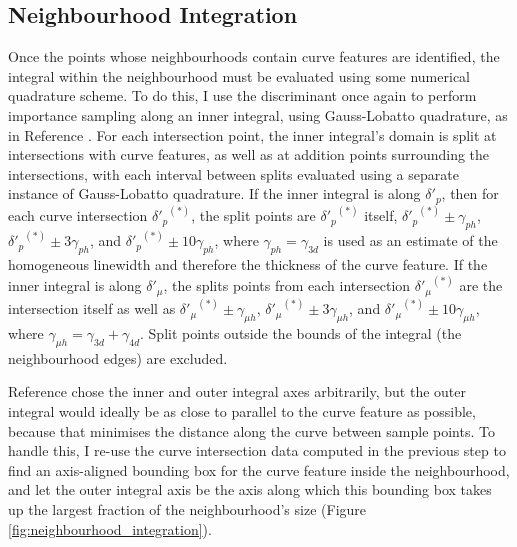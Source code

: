\subsection{Neighbourhood Integration}
Once the points whose neighbourhoods contain curve features are identified, the integral within the neighbourhood must be evaluated using some numerical quadrature scheme. To do this, I use the discriminant once again to perform importance sampling along an inner integral, using Gauss-Lobatto quadrature, as in Reference \cite{barnett_longdell_2020}. For each intersection point, the inner integral's domain is split at intersections with curve features, as well as at addition points surrounding the intersections, with each interval between splits evaluated using a separate instance of Gauss-Lobatto quadrature. If the inner integral is along $\delta'_p$, then for each curve intersection ${\delta'_p}^{(*)}$, the split points are ${\delta'_p}^{(*)}$ itself, ${\delta'_p}^{(*)} \pm \gamma_{ph}$, ${\delta'_p}^{(*)} \pm 3\gamma_{ph}$, and ${\delta'_p}^{(*)} \pm 10\gamma_{ph}$, where $\gamma_{ph} = \gamma_{3d}$ is used as an estimate of the homogeneous linewidth and therefore the thickness of the curve feature. If the inner integral is along $\delta'_\mu$, the splits points from each intersection ${\delta'_\mu}^{(*)}$ are the intersection itself as well as ${\delta'_\mu}^{(*)} \pm \gamma_{\mu h}$, ${\delta'_\mu}^{(*)} \pm 3\gamma_{\mu h}$, and ${\delta'_\mu}^{(*)} \pm 10\gamma_{\mu h}$, where $\gamma_{\mu h} = \gamma_{3d} + \gamma_{4d}$. Split points outside the bounds of the integral (the neighbourhood edges) are excluded.

Reference \cite{barnett_longdell_2020} chose the inner and outer integral axes arbitrarily, but the outer integral would ideally be as close to parallel to the curve feature as possible, because that minimises the distance along the curve between sample points. To handle this, I re-use the curve intersection data computed in the previous step to find an axis-aligned bounding box for the curve feature inside the neighbourhood, and let the outer integral axis be the axis along which this bounding box takes up the largest fraction of the neighbourhood's size (Figure \ref{fig:neighbourhood_integration}).

